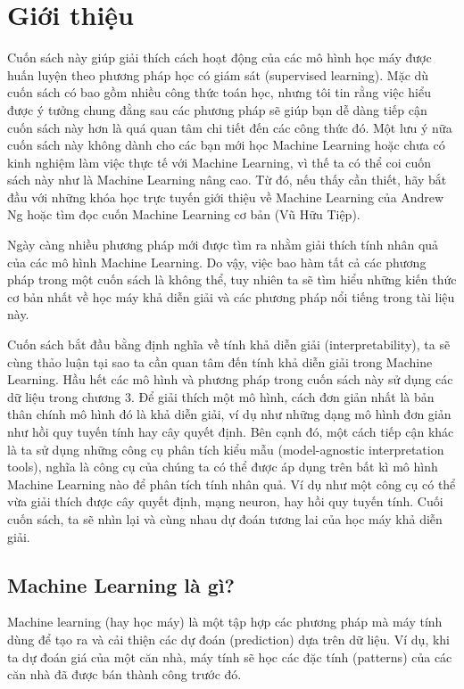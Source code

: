 \chapter{Giới thiệu}
Cuốn sách này giúp giải thích cách hoạt động của các mô hình học máy được huấn luyện theo phương pháp học có giám sát (supervised learning). Mặc dù cuốn sách có bao gồm nhiều công thức toán học, nhưng tôi tin rằng việc hiểu được ý tưởng chung đằng sau các phương pháp sẽ giúp bạn dễ dàng tiếp cận cuốn sách này hơn là quá quan tâm chi tiết đến các công thức đó. Một lưu ý nữa cuốn sách này không dành cho các bạn mới học Machine Learning hoặc chưa có kinh nghiệm làm việc thực tế với Machine Learning, vì thế ta có thể coi cuốn sách này như là Machine Learning nâng cao. Từ đó, nếu thấy cần thiết, hãy bắt đầu với những khóa học trực tuyến giới thiệu về Machine Learning của Andrew Ng hoặc tìm đọc cuốn Machine Learning cơ bản (Vũ Hữu Tiệp).

Ngày càng nhiều phương pháp mới được tìm ra nhằm giải thích tính nhân quả của các mô hình Machine Learning. Do vậy, việc bao hàm tất cả các phương pháp trong một cuốn sách là không thể, tuy nhiên ta sẽ tìm hiểu những kiến thức cơ bản nhất về học máy khả diễn giải và các phương pháp nổi tiếng trong tài liệu này.

Cuốn sách bắt đầu bằng định nghĩa về tính khả diễn giải (interpretability), ta sẽ cùng thảo luận tại sao ta cần quan tâm đến tính khả diễn giải trong Machine Learning. Hầu hết các mô hình và phương pháp trong cuốn sách này sử dụng các dữ liệu trong chương 3. Để giải thích một mô hình, cách đơn giản nhất là bản thân chính mô hình đó là khả diễn giải, ví dụ như những dạng mô hình đơn giản như hồi quy tuyến tính hay cây quyết định. Bên cạnh đó, một cách tiếp cận khác là ta sử dụng những công cụ phân tích kiểu mẫu (model-agnostic interpretation tools), nghĩa là công cụ của chúng ta có thể được áp dụng trên bất kì mô hình Machine Learning nào để phân tích tính nhân quả. Ví dụ như một công cụ có thể vừa giải thích được cây quyết định, mạng neuron, hay hồi quy tuyến tính. Cuối cuốn sách, ta sẽ nhìn lại và cùng nhau dự đoán tương lai của học máy khả diễn giải.

\section{Machine Learning là gì?}
Machine learning (hay học máy) là một tập hợp các phương pháp mà máy tính dùng để tạo ra và cải thiện các dự đoán (prediction) dựa trên dữ liệu. Ví dụ, khi ta dự đoán giá của một căn nhà, máy tính sẽ học các đặc tính (patterns) của các căn nhà đã được bán thành công trước đó.

